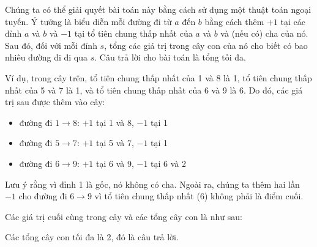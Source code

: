 Chúng ta có thể giải quyết bài toán này bằng cách sử dụng một thuật toán ngoại tuyến.
Ý tưởng là biểu diễn mỗi đường đi từ $a$ đến $b$
bằng cách thêm $+1$ tại các đỉnh $a$ và $b$
và $-1$ tại tổ tiên chung thấp nhất của $a$ và $b$
và (nếu có) cha của nó.
Sau đó, đối với mỗi đỉnh $s$, tổng các giá trị trong cây con của nó
cho biết có bao nhiêu đường đi đi qua $s$.
Câu trả lời cho bài toán là tổng tối đa.

Ví dụ, trong cây trên,
tổ tiên chung thấp nhất của 1 và 8 là 1,
tổ tiên chung thấp nhất của 5 và 7 là 1,
và tổ tiên chung thấp nhất của 6 và 9 là 6.
Do đó, các giá trị sau được thêm vào cây:
\begin{itemize}
\item đường đi $1 \to 8$: $+1$ tại 1 và 8, $-1$ tại 1
\item đường đi $5 \to 7$: $+1$ tại 5 và 7, $-1$ tại 1
\item đường đi $6 \to 9$: $+1$ tại 6 và 9, $-1$ tại 6 và 2
\end{itemize}
Lưu ý rằng vì đỉnh 1 là gốc, nó không có cha.
Ngoài ra, chúng ta thêm hai lần $-1$ cho đường đi $6 \to 9$
vì tổ tiên chung thấp nhất (6) không phải là điểm cuối.

Các giá trị cuối cùng trong cây và các tổng cây con là như sau:
\begin{center}
\end{center}
Các tổng cây con tối đa là 2, đó là câu trả lời.
